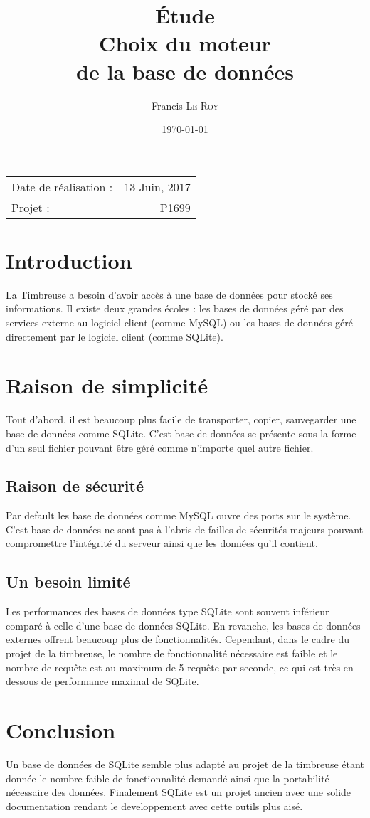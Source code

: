 \documentclass[10pt,a4paper,onecolumn]{article}
\title{Étude \\ Choix du moteur \\ de la base de données}
\author{Francis \textsc{Le Roy}}
\date{\today}
\begin{document}
\maketitle
\thispagestyle{fancy}

\begin{center}
\begin{tabular}{l r}
Date de réalisation : & 13 Juin, 2017 \\
Projet : & P1699 \\
\end{tabular}
\end{center}


\section{Introduction}
La Timbreuse a besoin d'avoir accès à une base de données pour stocké ses informations. Il existe deux grandes écoles : les bases de données géré par des services externe au logiciel client (comme MySQL) ou les bases de données géré directement par le logiciel client (comme SQLite).
\section{Raison de simplicité}
Tout d'abord, il est beaucoup plus facile de transporter, copier, sauvegarder une base de données comme SQLite. C'est base de données se présente sous la forme d'un seul fichier pouvant être géré comme n'importe quel autre fichier. 
\subsection{Raison de sécurité}
Par default les base de données comme MySQL ouvre des ports sur le système. C'est base de données ne sont pas à l'abris de failles de sécurités majeurs pouvant compromettre l'intégrité du serveur ainsi que les données qu'il contient.
\subsection{Un besoin limité}
Les performances des bases de données type SQLite sont souvent inférieur comparé à celle d'une base de données SQLite. En revanche, les bases de données externes offrent beaucoup plus de fonctionnalités. Cependant, dans le cadre du projet de la timbreuse, le nombre de fonctionnalité nécessaire est faible et le nombre de requête est au maximum de 5 requête par seconde, ce qui est très en dessous de performance maximal de SQLite.

\section{Conclusion}
Un base de données de SQLite semble plus adapté au projet de la timbreuse étant donnée le nombre faible de fonctionnalité demandé ainsi que la portabilité nécessaire des données. Finalement SQLite est un projet ancien avec une solide documentation rendant le developpement avec cette outils plus aisé.

\printbibliography
\end{document}
